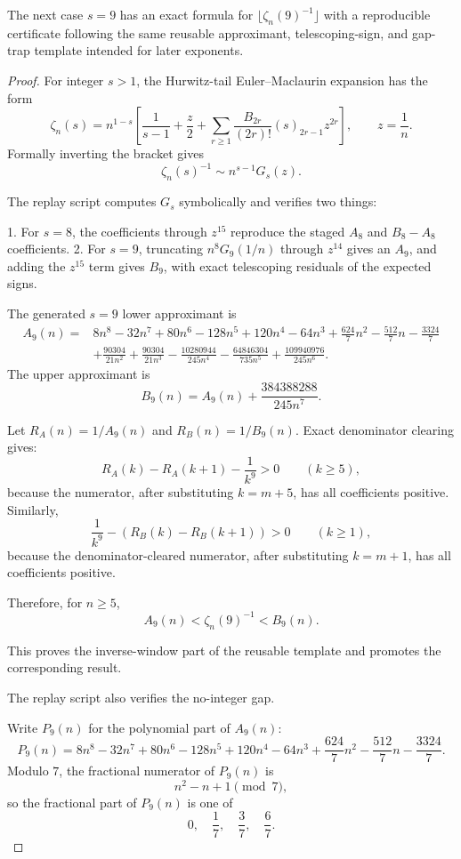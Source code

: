 \begin{proposition}
\label{res:zeta-tail-s9-reusable-certificate}
The next case \(s=9\) has an exact formula for \(\lfloor\zeta_n(9)^{-1}\rfloor\) with a reproducible certificate following the same reusable approximant, telescoping-sign, and gap-trap template intended for later exponents.
\end{proposition}
\begin{proof}
For integer \(s>1\), the Hurwitz-tail Euler--Maclaurin expansion has the form
\[
\zeta_n(s)
=n^{1-s}\left[
\frac1{s-1}+\frac{z}{2}
+\sum_{r\ge1}\frac{B_{2r}}{(2r)!}(s)_{2r-1}z^{2r}
\right],
\qquad z=\frac1n.
\]
Formally inverting the bracket gives
\[
\zeta_n(s)^{-1}\sim n^{s-1}G_s(z).
\]

The replay script
computes \(G_s\) symbolically and verifies two things:

1. For \(s=8\), the coefficients through \(z^{15}\) reproduce the staged \(A_8\) and \(B_8-A_8\) coefficients.
2. For \(s=9\), truncating \(n^8G_9(1/n)\) through \(z^{14}\) gives an \(A_9\), and adding the \(z^{15}\) term gives \(B_9\), with exact telescoping residuals of the expected signs.

The generated \(s=9\) lower approximant is
\[
\begin{aligned}
A_9(n)=&8n^8-32n^7+80n^6-128n^5+120n^4-64n^3
+\frac{624}{7}n^2-\frac{512}{7}n-\frac{3324}{7}\\
&+\frac{90304}{21n^2}+\frac{90304}{21n^3}
-\frac{10280944}{245n^4}-\frac{64846304}{735n^5}
+\frac{109940976}{245n^6}.
\end{aligned}
\]
The upper approximant is
\[
B_9(n)=A_9(n)+\frac{384388288}{245n^7}.
\]

Let \(R_A(n)=1/A_9(n)\) and \(R_B(n)=1/B_9(n)\). Exact denominator clearing gives:
\[
R_A(k)-R_A(k+1)-\frac1{k^9}>0
\qquad(k\ge5),
\]
because the numerator, after substituting \(k=m+5\), has all coefficients positive. Similarly,
\[
\frac1{k^9}-\left(R_B(k)-R_B(k+1)\right)>0
\qquad(k\ge1),
\]
because the denominator-cleared numerator, after substituting \(k=m+1\), has all coefficients positive.

Therefore, for \(n\ge5\),
\[
A_9(n)<\zeta_n(9)^{-1}<B_9(n).
\]

This proves the inverse-window part of the reusable template and promotes the corresponding result.

The replay script also verifies the no-integer gap.

Write \(P_9(n)\) for the polynomial part of \(A_9(n)\):
\[
P_9(n)=8n^8-32n^7+80n^6-128n^5+120n^4-64n^3
+\frac{624}{7}n^2-\frac{512}{7}n-\frac{3324}{7}.
\]
Modulo \(7\), the fractional numerator of \(P_9(n)\) is
\[
n^2-n+1\pmod 7,
\]
so the fractional part of \(P_9(n)\) is one of
\[
0,\quad \frac17,\quad \frac37,\quad \frac67.
\]


\end{proof}

